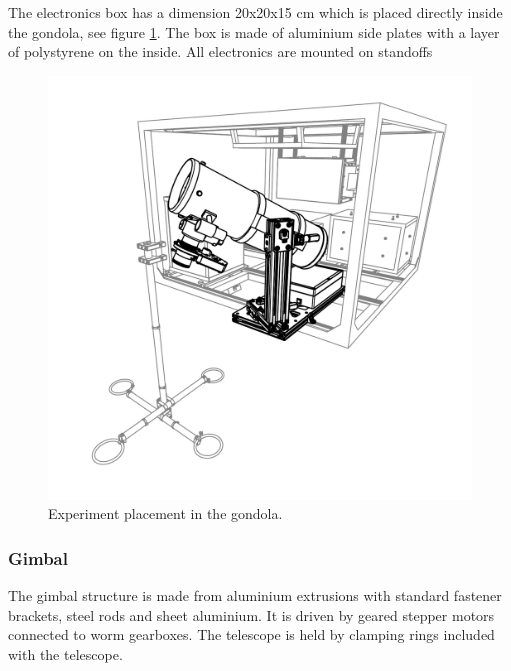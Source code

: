 The electronics box has a dimension 20x20x15 cm which is placed directly inside the gondola, see figure \ref{fig::mechanical::ebox}. The box is made of aluminium side plates with a layer of polystyrene on the inside. All electronics are mounted on standoffs 

\begin{figure}[H]
	\centering 
	\includegraphics[width=\textwidth]{4-experiment-design/img/mechanical/IRISC1.pdf}
	\caption{Experiment placement in the gondola.}
	\label{fig::mechanical::ebox}
\end{figure}


\subsubsection{Gimbal}
\label {sec:4.4.3}

The gimbal structure is made from aluminium extrusions with standard fastener brackets, steel rods and sheet aluminium. It is driven by geared stepper motors connected to worm gearboxes. The telescope is held by clamping rings included with the telescope. 

